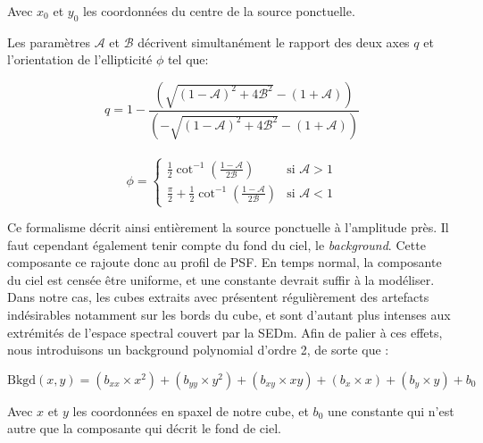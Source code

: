 \documentclass[../main/main.tex]{subfiles}
\begin{document}
Avec $x_{0}$ et $y_{0}$ les coordonnées du centre de la source
ponctuelle.

Les paramètres $\mathcal{A}$ et $\mathcal{B}$ décrivent simultanément le
rapport des deux axes $q$ et l'orientation de l'ellipticité $\phi$ tel
que:

\begin{equation}
  \label{eq:axesratioellipse}
  q=1-\frac{\left( \sqrt{(1-\mathcal{A})^{2}+4\mathcal{B}^{2}}-(1+\mathcal{A})\right)}{\left( -\sqrt{(1-\mathcal{A})^{2}+4\mathcal{B}^{2}}-(1+\mathcal{A})\right)}
\end{equation}\\

\begin{equation}
  \label{eq:angleellipse}
  \phi= \left\{
    \begin{array}{ll}
        \frac{1}{2}\cot^{-1}\left(\frac{1-\mathcal{A}}{2\mathcal{B}}\right) & \mbox{si } \mathcal{A}>1 \\
         \frac{\pi}{2}+\frac{1}{2}\cot^{-1}\left(\frac{1-\mathcal{A}}{2\mathcal{B}}\right) & \mbox{si } \mathcal{A}<1 
    \end{array}
\right.
\end{equation}


Ce formalisme décrit ainsi entièrement la source ponctuelle à
l'amplitude près. Il faut cependant également tenir compte du fond du
ciel, le \textit{background}. Cette composante ce rajoute donc au profil
de PSF. En temps normal, la composante du ciel est censée être uniforme,
et une constante devrait suffir à la modéliser. Dans notre cas, les
cubes extraits avec  \citep{pysedm} présentent régulièrement
des artefacts indésirables notamment sur les bords du cube, et sont
d'autant plus intenses aux extrémités de l'espace spectral couvert par
la SEDm. Afin de palier à ces effets, nous introduisons un background
polynomial d'ordre 2, de sorte que :

\begin{equation}
  \label{eq:backgroundcurved}
  \text{Bkgd}(x,y) = (b_{xx}\times x^{2})+ (b_{yy}\times y^{2})+(b_{xy}\times xy)+(b_{x}\times x)+(b_{y}\times y) + b_{0}
\end{equation}

Avec $x$ et $y$ les coordonnées en spaxel de notre cube, et $b_{0}$ une
constante qui n'est autre que la composante qui décrit le fond de ciel.
\end{document}
